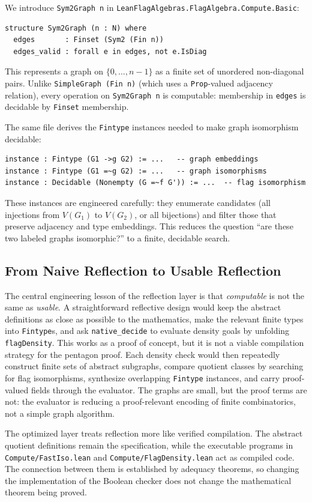 \documentclass{article}
\newcommand{\lean}[1]{\texttt{#1}}
\begin{document}
We introduce \lean{Sym2Graph n} in
\lean{LeanFlagAlgebras.FlagAlgebra.Compute.Basic}:
\begin{lstlisting}
structure Sym2Graph (n : N) where
  edges       : Finset (Sym2 (Fin n))
  edges_valid : forall e in edges, not e.IsDiag
\end{lstlisting}
This represents a graph on $\{0,\ldots,n-1\}$ as a finite set of unordered
non-diagonal pairs.  Unlike \lean{SimpleGraph (Fin n)} (which uses a
\lean{Prop}-valued adjacency relation), every operation on \lean{Sym2Graph n}
is computable: membership in \lean{edges} is decidable by \lean{Finset}
membership.

The same file derives the \lean{Fintype} instances needed to make graph
isomorphism decidable:
\begin{lstlisting}
instance : Fintype (G1 ->g G2) := ...   -- graph embeddings
instance : Fintype (G1 =~g G2) := ...   -- graph isomorphisms
instance : Decidable (Nonempty (G =~f G')) := ...  -- flag isomorphism
\end{lstlisting}
These instances are engineered carefully: they enumerate candidates (all
injections from $V(G_1)$ to $V(G_2)$, or all bijections) and filter those
that preserve adjacency and type embeddings.  This reduces the question ``are
these two labeled graphs isomorphic?'' to a finite, decidable search.

\subsection{From Naive Reflection to Usable Reflection}

The central engineering lesson of the reflection layer is that
\emph{computable} is not the same as \emph{usable}.  A straightforward
reflective design would keep the abstract definitions as close as possible to
the mathematics, make the relevant finite types into \lean{Fintype}s, and ask
\lean{native\_decide} to evaluate density goals by unfolding
\lean{flagDensity}.  This works as a proof of concept, but it is not a viable
compilation strategy for the pentagon proof.  Each density check would then
repeatedly construct finite sets of abstract subgraphs, compare quotient
classes by searching for flag isomorphisms, synthesize overlapping
\lean{Fintype} instances, and carry proof-valued fields through the evaluator.
The graphs are small, but the proof terms are not: the evaluator is reducing a
proof-relevant encoding of finite combinatorics, not a simple graph algorithm.

The optimized layer treats reflection more like verified compilation.  The
abstract quotient definitions remain the specification, while the executable
programs in \lean{Compute/FastIso.lean} and \lean{Compute/FlagDensity.lean}
act as compiled code.  The connection between them is established by adequacy
theorems, so changing the implementation of the Boolean checker does not change
the mathematical theorem being proved.
\end{document}
